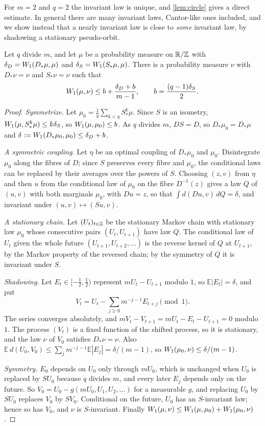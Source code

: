 For $m=2$ and $q=2$ the invariant law is unique, and \cref{lem:circle} gives a direct estimate. In general there are many
invariant laws, Cantor-like ones included, and we show instead that a nearly invariant law is close to \emph{some} invariant
law, by shadowing a stationary pseudo-orbit.

\begin{lemma}[Shadowing]\label{lem:shadowing}
Let $q$ divide $m$, and let $\mu$ be a probability measure on $\mathbb R/\mathbb Z$ with $\delta_D=W_1(D_*\mu,\mu)$ and
$\delta_S=W_1(S_*\mu,\mu)$. There is a probability measure $\nu$ with $D_*\nu=\nu$ and $S_*\nu=\nu$ such that
\[
W_1(\mu,\nu)\le b+\frac{\delta_D+b}{m-1},\qquad b=\frac{(q-1)\delta_S}2 .
\]
\end{lemma}

\begin{proof}
\emph{Symmetrize.} Let $\mu_0=\frac1q\sum_{k<q}S^k_*\mu$. Since $S$ is an isometry, $W_1(\mu,S^k_*\mu)\le k\delta_S$, so
$W_1(\mu,\mu_0)\le b$. As $q$ divides $m$, $DS=D$, so $D_*\mu_0=D_*\mu$ and $\delta:=W_1(D_*\mu_0,\mu_0)\le\delta_D+b$.

\emph{A symmetric coupling.} Let $\eta$ be an optimal coupling of $D_*\mu_0$ and $\mu_0$. Disintegrate $\mu_0$ along the fibres
of $D$; since $S$ preserves every fibre and $\mu_0$, the conditional laws can be replaced by their averages over the powers of
$S$. Choosing $(z,v)$ from $\eta$ and then $u$ from the conditional law of $\mu_0$ on the fibre $D^{-1}(z)$ gives a law $Q$ of
$(u,v)$ with both marginals $\mu_0$, with $Du=z$, so that $\int d(Du,v)\,dQ=\delta$, and invariant under $(u,v)\mapsto(Su,v)$.

\emph{A stationary chain.} Let $(U_t)_{t\in\mathbb Z}$ be the stationary Markov chain with stationary law $\mu_0$ whose consecutive
pairs $(U_t,U_{t+1})$ have law $Q$. The conditional law of $U_t$ given the whole future $(U_{t+1},U_{t+2},\dots)$ is the
reverse kernel of $Q$ at $U_{t+1}$, by the Markov property of the reversed chain; by the symmetry of $Q$ it is invariant
under $S$.

\emph{Shadowing.} Let $E_t\in[-\frac12,\frac12)$ represent $mU_t-U_{t+1}$ modulo $1$, so $\mathbb E|E_t|=\delta$, and put
\[
V_t=U_t-\sum_{j\ge0}m^{-j-1}E_{t+j}\pmod1 .
\]
The series converges absolutely, and $mV_t-V_{t+1}=mU_t-E_t-U_{t+1}=0$ modulo $1$. The process $(V_t)$ is a fixed function of
the shifted process, so it is stationary, and the law $\nu$ of $V_0$ satisfies $D_*\nu=\nu$. Also
$\mathbb E\,d(U_0,V_0)\le\sum_jm^{-j-1}\mathbb E|E_j|=\delta/(m-1)$, so $W_1(\mu_0,\nu)\le\delta/(m-1)$.

\emph{Symmetry.} $E_0$ depends on $U_0$ only through $mU_0$, which is unchanged when $U_0$ is replaced by $SU_0$ because $q$
divides $m$, and every later $E_j$ depends only on the future. So $V_0=U_0-g(mU_0,U_1,U_2,\dots)$ for a measurable $g$, and
replacing $U_0$ by $SU_0$ replaces $V_0$ by $SV_0$. Conditional on the future, $U_0$ has an $S$-invariant law; hence so has
$V_0$, and $\nu$ is $S$-invariant. Finally $W_1(\mu,\nu)\le W_1(\mu,\mu_0)+W_1(\mu_0,\nu)$.
\end{proof}

